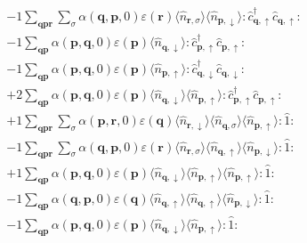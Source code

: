 \begin{align*}
	&-1 \sum_{ \mathbf{q} \mathbf{p} \mathbf{r} } \sum_{ \sigma } \alpha( \mathbf{q}, \mathbf{p}, 0 )  \varepsilon( \mathbf{r} )   \langle \hat{n}_{ \mathbf{r}, \sigma } \rangle \langle \hat{n}_{ \mathbf{p}, \downarrow } \rangle :\hat{c}_{ \mathbf{q}, \uparrow }^\dagger \hat{c}_{ \mathbf{q}, \uparrow }^{\phantom{\dagger}}: \\
	&-1 \sum_{ \mathbf{q} \mathbf{p} } \alpha( \mathbf{p}, \mathbf{q}, 0 )  \varepsilon( \mathbf{p} )   \langle \hat{n}_{ \mathbf{q}, \downarrow } \rangle :\hat{c}_{ \mathbf{p}, \uparrow }^\dagger \hat{c}_{ \mathbf{p}, \uparrow }^{\phantom{\dagger}}: \\
	&-1 \sum_{ \mathbf{q} \mathbf{p} } \alpha( \mathbf{p}, \mathbf{q}, 0 )  \varepsilon( \mathbf{p} )   \langle \hat{n}_{ \mathbf{p}, \uparrow } \rangle :\hat{c}_{ \mathbf{q}, \downarrow }^\dagger \hat{c}_{ \mathbf{q}, \downarrow }^{\phantom{\dagger}}: \\
	&+2 \sum_{ \mathbf{q} \mathbf{p} } \alpha( \mathbf{p}, \mathbf{q}, 0 )  \varepsilon( \mathbf{p} )   \langle \hat{n}_{ \mathbf{q}, \downarrow } \rangle \langle \hat{n}_{ \mathbf{p}, \uparrow } \rangle :\hat{c}_{ \mathbf{p}, \uparrow }^\dagger \hat{c}_{ \mathbf{p}, \uparrow }^{\phantom{\dagger}}: \\
	&+1 \sum_{ \mathbf{q} \mathbf{p} \mathbf{r} } \sum_{ \sigma } \alpha( \mathbf{p}, \mathbf{r}, 0 )  \varepsilon( \mathbf{q} )   \langle \hat{n}_{ \mathbf{r}, \downarrow } \rangle \langle \hat{n}_{ \mathbf{q}, \sigma } \rangle \langle \hat{n}_{ \mathbf{p}, \uparrow } \rangle : \hat{1} : \\
	&-1 \sum_{ \mathbf{q} \mathbf{p} \mathbf{r} } \sum_{ \sigma } \alpha( \mathbf{q}, \mathbf{p}, 0 )  \varepsilon( \mathbf{r} )   \langle \hat{n}_{ \mathbf{r}, \sigma } \rangle \langle \hat{n}_{ \mathbf{q}, \uparrow } \rangle \langle \hat{n}_{ \mathbf{p}, \downarrow } \rangle : \hat{1} : \\
	&+1 \sum_{ \mathbf{q} \mathbf{p} } \alpha( \mathbf{p}, \mathbf{q}, 0 )  \varepsilon( \mathbf{p} )   \langle \hat{n}_{ \mathbf{q}, \downarrow } \rangle \langle \hat{n}_{ \mathbf{p}, \uparrow } \rangle \langle \hat{n}_{ \mathbf{p}, \uparrow } \rangle : \hat{1} : \\
	&-1 \sum_{ \mathbf{q} \mathbf{p} } \alpha( \mathbf{q}, \mathbf{p}, 0 )  \varepsilon( \mathbf{q} )   \langle \hat{n}_{ \mathbf{q}, \uparrow } \rangle \langle \hat{n}_{ \mathbf{q}, \uparrow } \rangle \langle \hat{n}_{ \mathbf{p}, \downarrow } \rangle : \hat{1} : \\
	&-1 \sum_{ \mathbf{q} \mathbf{p} } \alpha( \mathbf{p}, \mathbf{q}, 0 )  \varepsilon( \mathbf{p} )   \langle \hat{n}_{ \mathbf{q}, \downarrow } \rangle \langle \hat{n}_{ \mathbf{p}, \uparrow } \rangle : \hat{1} : \\

\end{align*}

